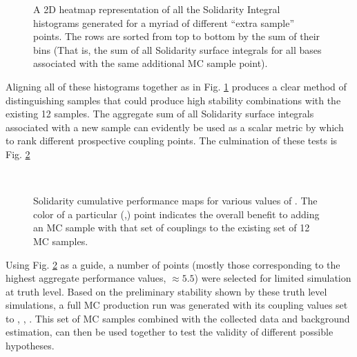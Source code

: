     \begin{figure}[tbh]
        \caption{
            A 2D heatmap representation of all the Solidarity Integral histograms generated for a myriad of different ``extra sample'' points.
            The rows are sorted from top to bottom by the sum of their bins
                (That is, the sum of all Solidarity surface integrals for all bases associated with the same additional MC sample point).
        }
        \label{fig:solidarity_dump}
    \end{figure}

    Aligning all of these histograms together as in Fig. \ref{fig:solidarity_dump}
        produces a clear method of distinguishing samples that 
        could produce high stability combinations with the existing 12 samples.
    The aggregate sum of all Solidarity surface integrals associated with a new sample
        can evidently be used as a scalar metric by which to rank different prospective coupling points.
    The culmination of these tests is Fig. \ref{fig:solidarity_performance_map}

    \begin{figure}[tbh]
        \\
        \caption{
            Solidarity cumulative performance maps for various values of \kv.
            The color of a particular (\kvv,\kl) point indicates the overall
                benefit to adding an MC sample with that set of couplings
                to the existing set of 12 MC samples.
        }
        \label{fig:solidarity_performance_map}
    \end{figure}

    Using Fig. \ref{fig:solidarity_performance_map} as a guide,
        a number of points (mostly those corresponding to the highest aggregate performance values, $\approx 5.5$)
        were selected for limited simulation at truth level.
    Based on the preliminary stability shown by these truth level simulations,
        a full MC production run was generated with its coupling values set to , , .
    This set of MC samples combined with the collected data and background estimation,
        can then be used together to test the validity of different possible hypotheses.
